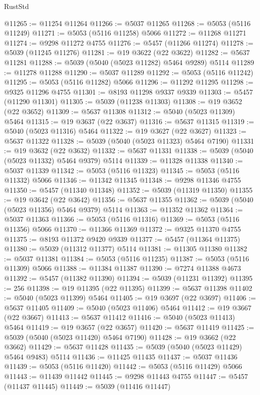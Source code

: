 \begin{lexlean}{RustStd}
\begin{coremodule}
@11265 := @11254 @11264
@11266 := @5037 @11265
@11268 := @5053 (@5116 @11249)
@11271 := @5053 (@5116 @11258) @5066
@11272 := @11268 @11271
@11274 := @9298 @11272 @4755
@11276 := @5457 (@11266 @11274)
@11278 := @5039 (@11245 @11276)
@11281 := @19 @3622 (@22 @3622)
@11282 := @5637 @11281
@11288 := @5039 (@5040 (@5023 @11282) @5464 @9289) @5114
@11289 := @11278 @11288
@11290 := @5037 @11289
@11292 := @5053 (@5116 @11242)
@11295 := @5053 (@5116 @11282) @5066
@11296 := @11292 @11295
@11298 := @9325 @11296 @4755
@11301 := @8193 @11298 @9337 @9339
@11303 := @5457 (@11290 @11301)
@11305 := @5039 (@11238 @11303)
@11308 := @19 @3652 (@22 @3652)
@11309 := @5637 @11308
@11312 := @5040 (@5023 @11309) @5464
@11315 := @19 @3637 (@22 @3637)
@11316 := @5637 @11315
@11319 := @5040 (@5023 @11316) @5464
@11322 := @19 @3627 (@22 @3627)
@11323 := @5637 @11322
@11328 := @5039 (@5040 (@5023 @11323) @5464 @7190)
@11331 := @19 @3632 (@22 @3632)
@11332 := @5637 @11331
@11338 := @5039 (@5040 (@5023 @11332) @5464 @9379) @5114
@11339 := @11328 @11338
@11340 := @5037 @11339
@11342 := @5053 (@5116 @11323)
@11345 := @5053 (@5116 @11332) @5066
@11346 := @11342 @11345
@11348 := @9298 @11346 @4755
@11350 := @5457 (@11340 @11348)
@11352 := @5039 (@11319 @11350)
@11355 := @19 @3642 (@22 @3642)
@11356 := @5637 @11355
@11362 := @5039 (@5040 (@5023 @11356) @5464 @9379) @5114
@11363 := @11352 @11362
@11364 := @5037 @11363
@11366 := @5053 (@5116 @11316)
@11369 := @5053 (@5116 @11356) @5066
@11370 := @11366 @11369
@11372 := @9325 @11370 @4755
@11375 := @8193 @11372 @9420 @9339
@11377 := @5457 (@11364 @11375)
@11380 := @5039 (@11312 @11377) @5114
@11381 := @11305 @11380
@11382 := @5037 @11381
@11384 := @5053 (@5116 @11235)
@11387 := @5053 (@5116 @11309) @5066
@11388 := @11384 @11387
@11390 := @7274 @11388 @4673
@11392 := @5457 (@11382 @11390)
@11394 := @5039 (@11231 @11392)
@11395 := 256
@11398 := @19 @11395 (@22 @11395)
@11399 := @5637 @11398
@11402 := @5040 (@5023 @11399) @5464
@11405 := @19 @3697 (@22 @3697)
@11406 := @5637 @11405
@11409 := @5040 (@5023 @11406) @5464
@11412 := @19 @3667 (@22 @3667)
@11413 := @5637 @11412
@11416 := @5040 (@5023 @11413) @5464
@11419 := @19 @3657 (@22 @3657)
@11420 := @5637 @11419
@11425 := @5039 (@5040 (@5023 @11420) @5464 @7190)
@11428 := @19 @3662 (@22 @3662)
@11429 := @5637 @11428
@11435 := @5039 (@5040 (@5023 @11429) @5464 @9483) @5114
@11436 := @11425 @11435
@11437 := @5037 @11436
@11439 := @5053 (@5116 @11420)
@11442 := @5053 (@5116 @11429) @5066
@11443 := @11439 @11442
@11445 := @9298 @11443 @4755
@11447 := @5457 (@11437 @11445)
@11449 := @5039 (@11416 @11447)

\end{coremodule}
\end{lexlean}
